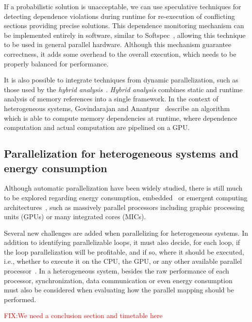 \documentclass[a4paper,12pt]{article}
\newcommand\FIXME[1]{\textcolor{red}{FIX:}\textcolor{red}{#1}}
\begin{document}
If a probabilistic solution is unacceptable, we can use speculative techniques
for detecting dependence violations during runtime for re-execution of
conflicting sections providing precise solutions.  This dependence monitoring
mechanism can be implemented entirely in software, similar to
Softspec~\cite{bruening98}, allowing this technique to be used in general
parallel hardware.  Although this mechanism guarantee correctness, it adds some
overhead to the overall execution, which needs to be properly balanced for
performance.

It is also possible to integrate techniques from dynamic parallelization, such
as those used by the \emph{hybrid analysis}~\cite{rus03}. \emph{Hybrid
analysis} combines static and runtime analysis of memory references into a
single framework.  In the context of heterogeneous systems, Govindarajan and
Anantpur~\cite{govindarajan13} describe an algorithm which is able to compute
memory dependencies at runtime, where dependence computation and actual
computation are pipelined on a GPU.

\subsection{Parallelization for heterogeneous systems and energy consumption}

Although automatic parallelization have been widely studied, there is still
much to be explored regarding energy consumption, embedded~\cite{cordes10} or
emergent computing
architectures~\cite{leung09,baskaran10,amini12,govindarajan13}, such as
massively parallel processors including graphic processing units (GPUs) or many
integrated cores (MICs).

Several new challenges are added when parallelizing for heterogeneous systems.
In addition to identifying parallelizable loops, it must also decide, for each
loop, if the loop parallelization will be profitable, and if so, where it
should be executed, i.e., whether to execute it on the CPU, the GPU, or any
other available parallel processor~\cite{tournavitis09,wang14a,leung09}.  In a
heterogeneous system, besides the raw performance of each processor,
synchronization, data communication or even energy consumption must also be
considered when evaluating how the parallel mapping should be performed.

\FIXME{We need a conclusion section and timetable here}



\end{document}
